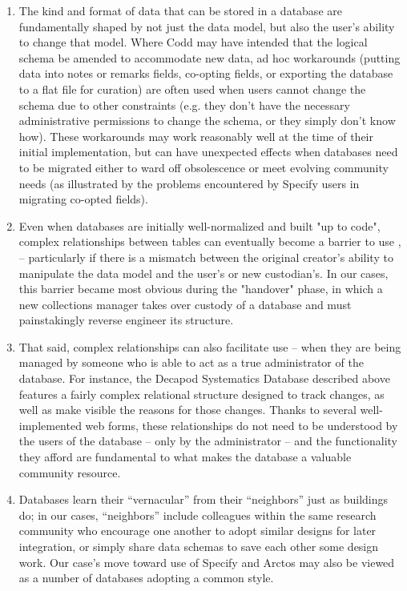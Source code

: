 \begin{enumerate}
\item The kind and format of data that can be stored in a database are fundamentally shaped by not just the data model, but also the user’s ability to change that model. Where Codd may have intended that the logical schema be amended to accommodate new data, ad hoc workarounds (putting data into notes or remarks fields, co-opting fields, or exporting the database to a flat file for curation) are often used when users cannot change the schema due to other constraints (e.g. they don't have the necessary administrative permissions to change the schema, or they simply don't know how). These workarounds may work reasonably well at the time of their initial implementation, but can have unexpected effects when databases need to be migrated either to ward off obsolescence or meet evolving community needs (as illustrated by the problems encountered by Specify users in migrating co-opted fields). 
\item Even when databases are initially well-normalized and built "up to code", complex relationships between tables can eventually become a barrier to use \cite{jagadish2007making}, – particularly if there is a mismatch between the original creator’s ability to manipulate the data model and the user’s or new custodian's. In our cases, this barrier became most obvious during the "handover" phase, in which a new collections manager takes over custody of a database and must painstakingly reverse engineer its structure. 
\item That said, complex relationships can also facilitate use -- when they are being managed by someone who is able to act as a true administrator of the database. For instance, the Decapod Systematics Database described above features a fairly complex relational structure designed to track changes, as well as make visible the reasons for those changes. Thanks to several well-implemented web forms, these relationships do not need to be understood by the users of the database – only by the administrator -- and the functionality they afford are fundamental to what makes the database a valuable community resource.
\item Databases learn their “vernacular” from their “neighbors” just as buildings do; in our cases, “neighbors” include colleagues within the same research community who encourage one another to adopt similar designs for later integration, or simply share data schemas to save each other some design work. Our case’s move toward use of Specify and Arctos may also be viewed as a number of databases adopting a common style. 

\end{enumerate}
